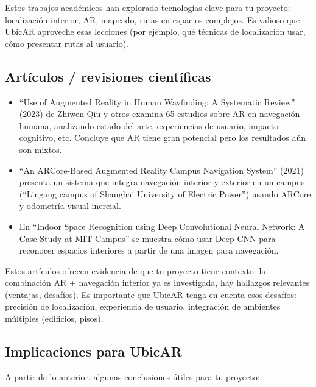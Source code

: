 Estos trabajos académicos han explorado tecnologías clave para tu proyecto: localización interior, AR, mapeado, rutas en espacios complejos. Es valioso que UbicAR aproveche esas lecciones (por ejemplo, qué técnicas de localización usar, cómo presentar rutas al usuario).

\newpage

\subsection{Artículos / revisiones científicas}

\begin{itemize}
	
	\item “Use of Augmented Reality in Human Wayfinding: A Systematic Review” (2023) de Zhiwen Qiu y otros examina 65 estudios sobre AR en navegación humana, analizando estado-del-arte, experiencias de usuario, impacto cognitivo, etc. Concluye que AR tiene gran potencial pero los resultados aún son mixtos. 
	
	\item “An ARCore-Based Augmented Reality Campus Navigation System” (2021) presenta un sistema que integra navegación interior y exterior en un campus (“Lingang campus of Shanghai University of Electric Power”) usando ARCore y odometría visual inercial. 
	
	\item En “Indoor Space Recognition using Deep Convolutional Neural Network: A Case Study at MIT Campus” se muestra cómo usar Deep CNN para reconocer espacios interiores a partir de una imagen para navegación.
	
\end{itemize}

Estos artículos ofrecen evidencia de que tu proyecto tiene contexto: la combinación AR + navegación interior ya es investigada, hay hallazgos relevantes (ventajas, desafíos). Es importante que UbicAR tenga en cuenta esos desafíos: precisión de localización, experiencia de usuario, integración de ambientes múltiples (edificios, pisos).

\subsection{Implicaciones para UbicAR} 

A partir de lo anterior, algunas conclusiones útiles para tu proyecto:

